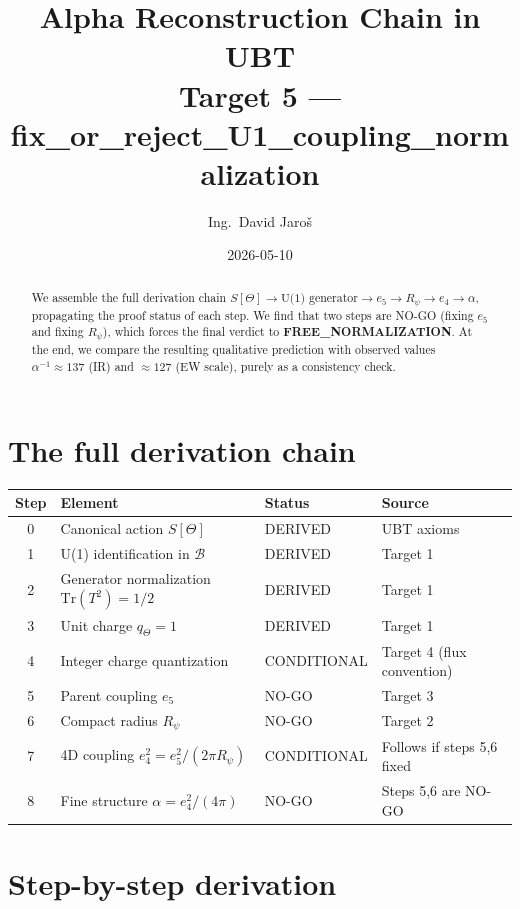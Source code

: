 \documentclass[11pt,a4paper]{article}
\title{Alpha Reconstruction Chain in UBT\\
\large Target 5 — fix\_or\_reject\_U1\_coupling\_normalization}
\author{Ing.\ David Jaroš}
\date{2026-05-10}
\begin{document}
\maketitle

\begin{abstract}
We assemble the full derivation chain
$S[\Theta]\to\text{U(1) generator}\to e_5\to R_\psi\to e_4\to\alpha$,
propagating the proof status of each step.  We find that two steps are
NO-GO (fixing $e_5$ and fixing $R_\psi$), which forces the final verdict to
\textbf{FREE\_NORMALIZATION}.  At the end, we compare the resulting
qualitative prediction with observed values $\alpha^{-1}\approx137$ (IR) and
$\approx127$ (EW scale), purely as a consistency check.
\end{abstract}

\section{The full derivation chain}

\begin{center}
\begin{tabular}{@{}clll@{}}
\toprule
Step & Element & Status & Source \\
\midrule
0 & Canonical action $S[\Theta]$ & DERIVED & UBT axioms \\
1 & U(1) identification in $\mathcal{B}$ & DERIVED & Target 1 \\
2 & Generator normalization $\mathrm{Tr}(T^2)=1/2$ & DERIVED & Target 1 \\
3 & Unit charge $q_\Theta=1$ & DERIVED & Target 1 \\
4 & Integer charge quantization & CONDITIONAL & Target 4 (flux convention) \\
5 & Parent coupling $e_5$ & NO-GO & Target 3 \\
6 & Compact radius $R_\psi$ & NO-GO & Target 2 \\
7 & 4D coupling $e_4^2=e_5^2/(2\pi R_\psi)$ & CONDITIONAL & Follows if steps 5,6 fixed \\
8 & Fine structure $\alpha=e_4^2/(4\pi)$ & NO-GO & Steps 5,6 are NO-GO \\
\bottomrule
\end{tabular}
\end{center}

\section{Step-by-step derivation}
\end{document}
